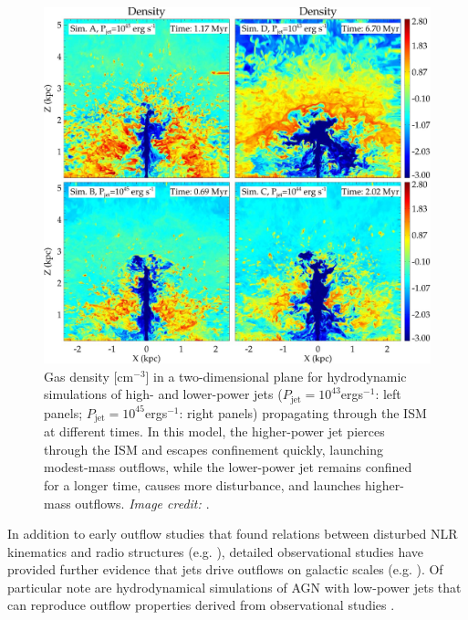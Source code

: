 \begin{figure}
    \centering
    \includegraphics[width=\linewidth]{figures/introduction/mukherjee2016_high_low_power_jets.jpeg}
    \caption[Snapshots of hydrodynamic simulations by \citet{Mukherjee2016} of a higher- and lower-power jet propagating through an ISM.]{Gas density [cm$^{-3}$] in a two-dimensional plane for hydrodynamic simulations of high- and lower-power jets ($P_\mathrm{jet}=10^{43}$\;erg\;s$^{-1}$: left panels; $P_\mathrm{jet}=10^{45}$\;erg\;s$^{-1}$: right panels) propagating through the ISM at different times. In this model, the higher-power jet pierces through the ISM and escapes confinement quickly, launching modest-mass outflows, while the lower-power jet remains confined for a longer time, causes more disturbance, and launches higher-mass outflows. \textit{Image credit: \citet{Mukherjee2016}}.}
    \label{fig: introduction: outflows: acceleration_mechanisms: mukherjee2016_high_low_power_jets}
\end{figure}

In addition to early outflow studies that found relations between disturbed NLR kinematics and radio structures (e.g. \citealt{Wilson1985, Whittle1988}), detailed observational studies have provided further evidence that jets drive outflows on galactic scales (e.g. \citealt{Morganti1998, Morganti2007, Nesvadba2008, Rosario2010a, Rosario2010b, Rosario2010c, Morganti2013_4c1250, Tadhunter2014, Mahony2016, May2017, Audibert2019, May2020, Venturi2021}). Of particular note are hydrodynamical simulations of AGN with low-power jets that can reproduce outflow properties derived from observational studies \citep{Morganti2015, Mukherjee2018, Audibert2023}.

